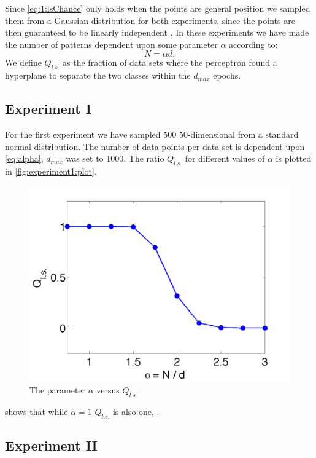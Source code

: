 Since \autoref{eq:1:lsChance} only holds when the points are general position we sampled them from a Gaussian distribution for both experiments, since the points are then guaranteed to be linearly independent \cite[Chapter~5]{prince2012computer}. In these experiments we have made the number of patterns dependent upon some parameter $\alpha$ according to: 
	\begin{equation}\label{eq:alpha}
		N = \alpha d.
	\end{equation}
We define $Q_{l.s.}$ as the fraction of data sets where the perceptron found a hyperplane to separate the two classes within the $d_{max}$ epochs.	

\subsection*{Experiment I}
For the first experiment we have sampled 500 50-dimensional from a standard normal distribution. The number of data points per data set is dependent upon \eqref{eq:alpha}, $d_{max}$ was set to 1000. The ratio $Q_{l.s.}$ for different values of $\alpha$ is plotted in \autoref{fig:experiment1:plot}.

\begin{figure}[H]
	\centering
	\includegraphics[width=\columnwidth]{./img/Aa_N50_nd500_nmax1000}
	\caption{The parameter $\alpha$ versus $Q_{l.s.}$.}
	\label{fig:experiment1:plot}
\end{figure}

 shows that while $\alpha = 1$ $Q_{l.s.}$ is also one, . 


\subsection*{Experiment II}

